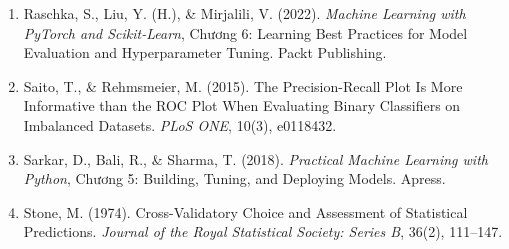 \begin{enumerate}
    \item Raschka, S., Liu, Y. (H.), \& Mirjalili, V. (2022). \textit{Machine Learning with PyTorch and Scikit-Learn}, Chương 6: Learning Best Practices for Model Evaluation and Hyperparameter Tuning. Packt Publishing.
    \item Saito, T., \& Rehmsmeier, M. (2015). The Precision-Recall Plot Is More Informative than the ROC Plot When Evaluating Binary Classifiers on Imbalanced Datasets. \textit{PLoS ONE}, 10(3), e0118432.
    \item Sarkar, D., Bali, R., \& Sharma, T. (2018). \textit{Practical Machine Learning with Python}, Chương 5: Building, Tuning, and Deploying Models. Apress.
    \item Stone, M. (1974). Cross-Validatory Choice and Assessment of Statistical Predictions. \textit{Journal of the Royal Statistical Society: Series B}, 36(2), 111--147.
\end{enumerate}
